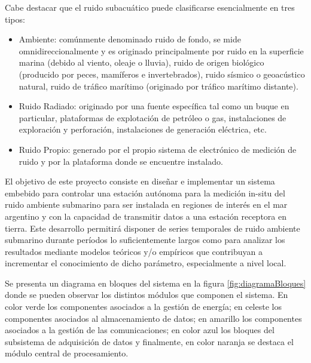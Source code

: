Cabe destacar que el ruido subacuático puede clasificarse esencialmente en tres tipos:

\begin{itemize}
	\item Ambiente: comúnmente denominado ruido de fondo, se mide omnidireccionalmente y es originado principalmente por ruido en la superficie marina (debido al viento, oleaje o lluvia), ruido de origen biológico (producido por peces, mamíferos e invertebrados), ruido sísmico o geoacústico natural, ruido de tráfico marítimo (originado por tráfico marítimo distante).
	\item Ruido Radiado: originado por una fuente específica tal como un buque en particular, plataformas de explotación de petróleo o gas, instalaciones de exploración y perforación, instalaciones de generación eléctrica, etc.
	\item Ruido Propio: generado por el propio sistema de electrónico de medición de ruido y por la plataforma donde se encuentre instalado.
\end{itemize} 

El objetivo de este proyecto consiste en diseñar e implementar un sistema embebido para controlar una estación autónoma para la medición in-situ del ruido ambiente submarino para ser instalada en regiones de interés en el mar argentino y con la capacidad de transmitir datos a una estación receptora en tierra. Este desarrollo permitirá disponer de series temporales de ruido ambiente submarino durante períodos lo suficientemente largos como para analizar los resultados mediante modelos teóricos y/o empíricos que contribuyan a incrementar el conocimiento de dicho parámetro, especialmente a nivel local.

Se presenta un diagrama en bloques del sistema en la figura \ref{fig:diagramaBloques} donde se pueden observar los distintos módulos que componen el sistema.  En color verde los componentes asociados a la gestión de energía; en celeste los componentes asociados al almacenamiento de datos; en amarillo los componentes asociados a la gestión de las comunicaciones; en color azul los bloques del subsistema de adquisición de datos y finalmente, en color naranja se destaca el módulo central de procesamiento.


